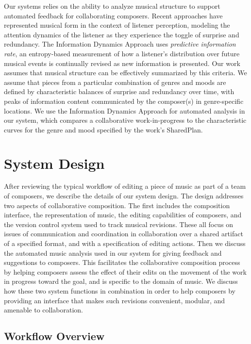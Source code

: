 \documentclass[final,authoryear,5p,times,twocolumn]{elsarticle}
\begin{document}
Our systems relies on the ability to analyze musical structure to support automated feedback for collaborating composers. Recent approaches have represented musical form in the context of listener perception, modeling the attention dynamics of the listener as they experience the toggle of surprise and redundancy. The Information Dynamics Approach \citep{abdallah2012cognitive} uses \textit{predictive information rate}, an entropy-based measurement of how a listener's distribution over future musical events is continually revised as new information is presented.  Our work assumes that musical structure can be effectively summarized by this criteria. We assume that pieces from a particular combination of genres and moods are defined by characteristic balances of surprise and redundancy over time, with peaks of information content communicated by the composer(s) in genre-specific locations. We use the Information Dynamics Approach for automated analysis in our system, which compares a collaborative work-in-progress to the characteristic curves for the genre and mood specified by the work's SharedPlan.

\section{System Design}

After reviewing the typical workflow of editing a piece of music as part of a team of composers, we describe the details of our system design. The design addresses two aspects of collaborative composition. The first includes the composition interface, the representation of music, the editing capabilities of composers, and the version control system used to track musical revisions. These all focus on issues of communication and coordination in collaboration over a shared artifact of a specified format, and with a specification of editing actions. Then we discuss the automated music analysis used in our system for giving feedback and suggestions to composers. This facilitates the collaborative composition process by helping composers assess the effect of their edits on the movement of the work in progress toward the goal, and is specific to the domain of music. We discuss how these two system functions in combination in order to help composers by providing an interface that makes such revisions convenient, modular, and amenable to collaboration.

\subsection{Workflow Overview}
\end{document}
